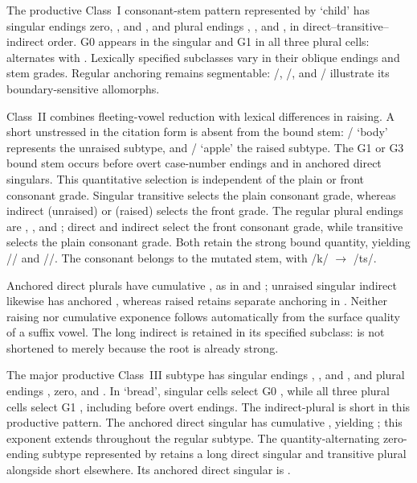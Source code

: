 The productive Class~I consonant-stem pattern represented by  `child' has
singular endings zero, , and , and plural endings
, , and , in direct--transitive--indirect order.
G0 appears in the singular and G1 in all three plural cells: 
alternates with .
Lexically specified subclasses vary in their oblique endings and stem grades.
Regular anchoring remains segmentable: /,
/, and / illustrate its
boundary-sensitive allomorphs.

Class~II combines fleeting-vowel reduction with lexical differences in raising.
A short unstressed  in the citation form is absent from the bound stem:
/ `body' represents the unraised subtype, and
/ `apple' the raised subtype. The G1 or G3 bound stem occurs before overt case-number
endings and in
anchored direct singulars. This quantitative selection is independent of
the plain or front consonant grade. Singular
transitive  selects the plain consonant grade, whereas indirect 
(unraised) or  (raised) selects the front grade. The regular plural
endings are , , and ; direct and indirect select
the front consonant grade, while transitive selects the plain consonant
grade. Both retain the strong bound quantity, yielding
// and
//. The consonant  belongs to
the mutated stem, with /k/ $\rightarrow$ /ts/.

Anchored direct plurals have cumulative , as in  and
; unraised singular indirect  likewise has anchored
, whereas raised  retains separate anchoring in
. Neither raising nor cumulative exponence follows automatically
from the surface quality of a suffix vowel. The long indirect 
is retained in its specified subclass:  is not shortened to
 merely because the root is already strong.

The major productive Class~III  subtype has singular endings ,
, and , and plural endings , zero, and .
In  `bread', singular cells select G0 , while all
three plural cells select G1 , including before overt endings.
The indirect-plural  is short in this productive pattern. The
anchored direct singular has cumulative , yielding
; this exponent extends throughout the regular  subtype.
The quantity-alternating zero-ending subtype represented by 
retains a long direct singular and transitive plural alongside short
 elsewhere. Its anchored direct singular is .

